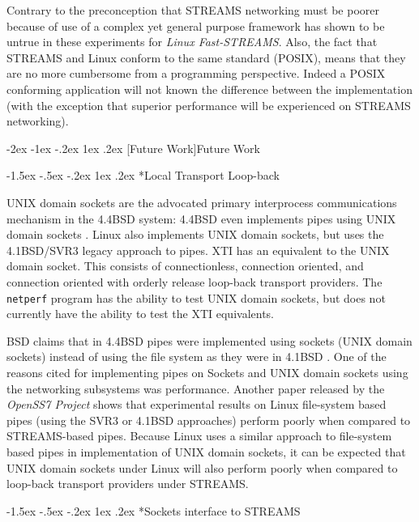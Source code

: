 \documentclass[letterpaper,final,notitlepage,twocolumn,10pt,twoside]{article}
\makeatletter
\renewcommand\section{\@startsection {section}{1}{\z@}%
                                   {-2ex \@plus -1ex \@minus -.2ex}%
                                   {1ex \@plus .2ex}%
                                   {\normalfont\large\bfseries}}
\renewcommand\subsection{\@startsection{subsection}{2}{\z@}%
                                     {-1.5ex \@plus -.5ex \@minus -.2ex}%
                                     {1ex \@plus .2ex}%
                                     {\normalfont\normalsize\bfseries}}
\makeatother
\begin{document}
\begin{itemize}
Contrary to the preconception that STREAMS networking must be poorer because of use of a complex yet
general purpose framework has shown to be untrue in these experiments for \textsl{Linux
Fast-STREAMS}.  Also, the fact that STREAMS and Linux conform to the same standard (POSIX), means
that they are no more cumbersome from a programming perspective.  Indeed a POSIX conforming
application will not known the difference between the implementation (with the exception that
superior performance will be experienced on STREAMS networking).

\end{itemize}

\section[Future Work]{Future Work}

\subsection*{Local Transport Loop-back}

UNIX domain sockets are the advocated primary interprocess communications mechanism in the 4.4BSD
system: 4.4BSD even implements pipes using UNIX domain sockets \cite[]{bsd}.  Linux also implements
UNIX domain sockets, but uses the 4.1BSD/SVR3 legacy approach to pipes.  XTI has an equivalent to
the UNIX domain socket.  This consists of connectionless, connection oriented, and connection
oriented with orderly release loop-back transport providers.  The \texttt{netperf} program has the
ability to test UNIX domain sockets, but does not currently have the ability to test the XTI
equivalents.

BSD claims that in 4.4BSD pipes were implemented using sockets (UNIX domain sockets) instead of
using the file system as they were in 4.1BSD \cite[]{bsd}.  One of the reasons cited for
implementing pipes on Sockets and UNIX domain sockets using the networking subsystems was
performance.  Another paper released by the \textsl{OpenSS7 Project} \cite[]{openss7} shows that
experimental results on Linux file-system based pipes (using the SVR3 or 4.1BSD approaches) perform
poorly when compared to STREAMS-based pipes.  Because Linux uses a similar approach to file-system
based pipes in implementation of UNIX domain sockets, it can be expected that UNIX domain sockets
under Linux will also perform poorly when compared to loop-back transport providers under STREAMS.

\subsection*{Sockets interface to STREAMS}
\end{document}
